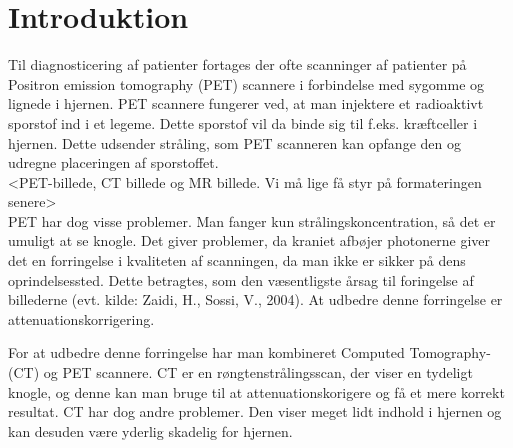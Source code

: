 \section{Introduktion}




Til diagnosticering af patienter fortages der ofte scanninger af patienter på
Positron emission tomography (PET) scannere i forbindelse med sygomme og
lignede i hjernen. PET scannere fungerer ved, at man injektere et radioaktivt
sporstof ind i et legeme. Dette sporstof vil da binde sig til f.eks.
kræftceller i hjernen. Dette udsender stråling, som PET scanneren kan opfange
den og udregne placeringen af sporstoffet.\\

<PET-billede, CT billede og MR billede. Vi må lige få styr på
formateringen senere>\\

PET har dog visse problemer. Man fanger kun strålingskoncentration, så det er
umuligt at se knogle. Det giver problemer, da kraniet afbøjer photonerne giver
det en forringelse i kvaliteten af scanningen, da man ikke er sikker på dens
oprindelsessted. Dette betragtes, som den væsentligste årsag til foringelse af
billederne (evt. kilde: Zaidi, H., Sossi, V., 2004). At udbedre denne
forringelse er attenuationskorrigering. 

For at udbedre denne forringelse har man kombineret Computed Tomography- (CT)
og PET scannere. CT er en røngtenstrålingsscan, der viser en tydeligt knogle,
og denne kan man bruge til at attenuationskorigere og få et mere korrekt
resultat. CT har dog andre problemer. Den viser meget lidt indhold i hjernen og
kan desuden være yderlig skadelig for hjernen. \\

